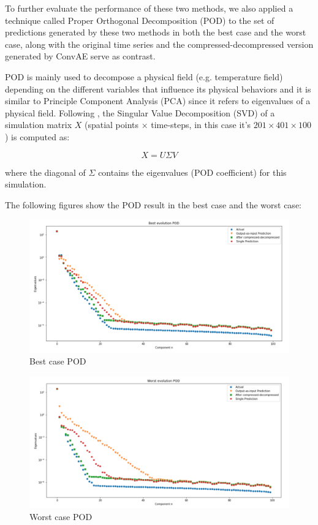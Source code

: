To further evaluate the performance of these two methods, we also applied a technique called Proper Orthogonal Decomposition (POD) to the set of predictions generated by these two methods in both the best case and the worst case, along with the original time series and the compressed-decompressed version generated by ConvAE serve as contrast.

POD is mainly used to decompose a physical field (e.g. temperature field) depending on the different variables that influence its physical behaviors and it is similar to Principle Component Analysis (PCA) since it refers to eigenvalues of a physical field.\citep{10.1146_annurev.fl.25.010193.002543} Following \citep{10.1515_9783110671490-007}, the Singular Value Decomposition (SVD) of a simulation matrix $X$ (spatial points × time-steps, in this case it's $201 \times 401 \times 100$) is computed as:

\begin{equation}
X = U\Sigma V
\end{equation}

where the diagonal of $\Sigma$ contains the eigenvalues (POD coefficient) for this simulation.

The following figures show the POD result in the best case and the worst case:

\begin{figure}[H]
    \caption{Best case POD}
    \includegraphics[scale=0.5]{Report LaTeX/figures/mantle_convection_images/limited_dataset/FNN_Best_POD.png}
\end{figure}

\begin{figure}[H]
    \caption{Worst case POD}
    \includegraphics[scale=0.5]{Report LaTeX/figures/mantle_convection_images/limited_dataset/FNN_Worst_POD.png}
\end{figure}

